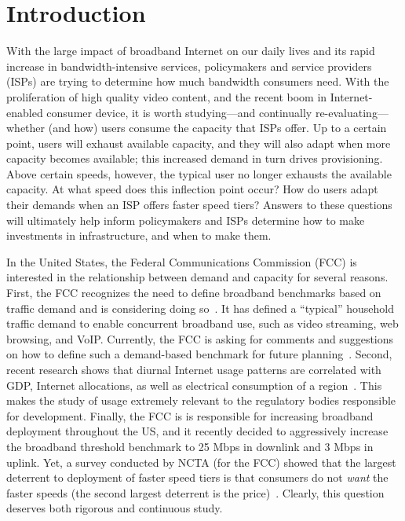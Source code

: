 \section{Introduction}\label{sec:introduction}

With the large impact of broadband Internet on our daily lives and its
rapid increase in bandwidth-intensive services, policymakers and service
providers (ISPs) are trying to determine how much bandwidth consumers
need. With the proliferation of high quality video content, and the
recent boom in Internet-enabled consumer device, it is worth
studying---and continually re-evaluating---whether (and how) users
consume the capacity that ISPs offer.  Up to a certain point, users will
exhaust available capacity, and they will also adapt when more capacity
becomes available; this increased demand in turn drives provisioning.
Above certain speeds, however, the typical user no longer exhausts the
available capacity. At what speed does this inflection point occur?  How
do users adapt their demands when an ISP offers faster speed tiers?
Answers to these questions will ultimately help inform policymakers and
ISPs determine how to make investments in infrastructure, and when to
make them.

In the United States, the Federal Communications Commission (FCC) is
interested in the relationship between demand and capacity for several
reasons.  First, the FCC recognizes the need to define broadband
benchmarks based on traffic demand and is considering doing
so~\cite{fcc2015broadband-report}. It has defined a ``typical''
household traffic demand to enable concurrent broadband use, such as
video streaming, web browsing, and VoIP. Currently, the FCC is asking
for comments and suggestions on how to define such a demand-based
benchmark for future planning~\cite{fcc2015progress-report,
  fcc2014progress-report}.  Second, recent research shows that diurnal
Internet usage patterns are correlated with GDP, Internet allocations,
as well as electrical consumption of a
region~\cite{ant-diurnal-web}. This makes the study of usage extremely
relevant to the regulatory bodies responsible for development.  Finally,
the FCC is is responsible for increasing broadband deployment throughout
the US, and it recently decided to aggressively increase the broadband
threshold benchmark to 25 Mbps in downlink and 3 Mbps in uplink.  Yet, a
survey conducted by NCTA (for the FCC) showed that the largest deterrent
to deployment of faster speed tiers is that consumers do not \emph{want}
the faster speeds (the second largest deterrent is the
price)~\cite{fcc2015progress-report}. Clearly, this question deserves
both rigorous and continuous study.

